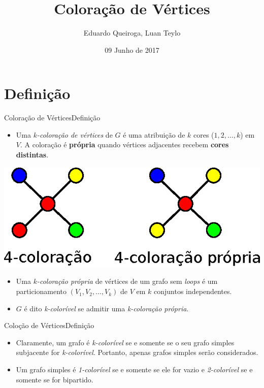 \documentclass{beamer}
\title[Coloração de Vértices]{Coloração de Vértices}
\author{Eduardo Queiroga, Luan Teylo}
\date{09 Junho de 2017}
\begin{document}
\begin{frame}
  \titlepage
\end{frame}


\section{Definição}
%

\begin{frame}{Coloração de Vértices}{Definição}

\begin{itemize}
      \item Uma \textit{$k$-coloração de vértices} de $G$ é uma atribuição de $k$ cores ($1,2,\dots,k$) em $V$. A coloração é \textbf{própria} quando vértices adjacentes recebem \textbf{cores distintas}.																	
\end{itemize}

  \begin{center}
      \includegraphics[scale=0.7]{color-propria.eps}
    \end{center}

  \begin{itemize}
      \item Uma \textit{$k$-coloração própria} de vértices de um grafo sem \textit{loops} é um particionamento $(V_1, V_2,\dots,V_k)$ de $V$ em $k$ conjuntos independentes.
      \item $G$ é dito \textit{k-colorível} se admitir uma \textit{k-coloração própria}.
  \end{itemize}
\end{frame}


\begin{frame}{Coloção de Vértices}{Definição}
    
    \begin{itemize}
        \item Claramente, um grafo é \textit{k-colorível} se e somente se o seu grafo simples subjacente for \textit{k-colorível}. Portanto, apenas grafos simples serão considerados.
    	\item Um grafo simples é \textit{1-colorível} se e somente se ele for vazio e \textit{2-colorível} se e somente se for bipartido.        
    \end{itemize}
\end{frame}
\end{document}
